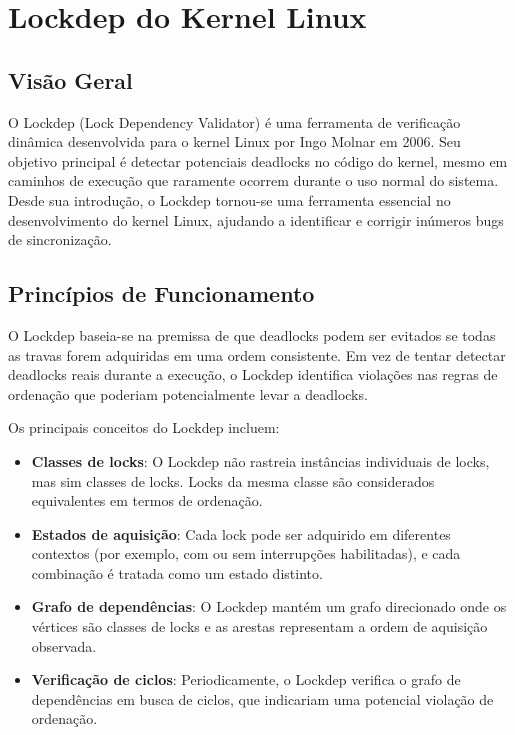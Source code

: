 \section{Lockdep do Kernel Linux}\label{sec:lockdep_linux}

\subsection{Visão Geral}

O Lockdep (Lock Dependency Validator) é uma ferramenta de verificação dinâmica desenvolvida para o kernel Linux por Ingo Molnar em 2006. Seu objetivo principal é detectar potenciais deadlocks no código do kernel, mesmo em caminhos de execução que raramente ocorrem durante o uso normal do sistema. Desde sua introdução, o Lockdep tornou-se uma ferramenta essencial no desenvolvimento do kernel Linux, ajudando a identificar e corrigir inúmeros bugs de sincronização.

\subsection{Princípios de Funcionamento}

O Lockdep baseia-se na premissa de que deadlocks podem ser evitados se todas as travas forem adquiridas em uma ordem consistente. Em vez de tentar detectar deadlocks reais durante a execução, o Lockdep identifica violações nas regras de ordenação que poderiam potencialmente levar a deadlocks.

Os principais conceitos do Lockdep incluem:

\begin{itemize}
    \item \textbf{Classes de locks}: O Lockdep não rastreia instâncias individuais de locks, mas sim classes de locks. Locks da mesma classe são considerados equivalentes em termos de ordenação.

    \item \textbf{Estados de aquisição}: Cada lock pode ser adquirido em diferentes contextos (por exemplo, com ou sem interrupções habilitadas), e cada combinação é tratada como um estado distinto.

    \item \textbf{Grafo de dependências}: O Lockdep mantém um grafo direcionado onde os vértices são classes de locks e as arestas representam a ordem de aquisição observada.

    \item \textbf{Verificação de ciclos}: Periodicamente, o Lockdep verifica o grafo de dependências em busca de ciclos, que indicariam uma potencial violação de ordenação.
\end{itemize}


